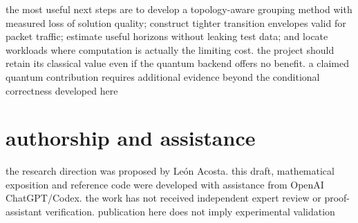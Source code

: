 \documentclass[11pt,a4paper]{article}
\newcommand{\1}{\mathbf{1}}
\begin{document}
the most useful next steps are to develop a topology-aware grouping method with measured loss of solution quality; construct tighter transition envelopes valid for packet traffic; estimate useful horizons without leaking test data; and locate workloads where computation is actually the limiting cost. the project should retain its classical value even if the quantum backend offers no benefit. a claimed quantum contribution requires additional evidence beyond the conditional correctness developed here

\section*{authorship and assistance}
the research direction was proposed by Le\'on Acosta. this draft, mathematical exposition and reference code were developed with assistance from OpenAI ChatGPT/Codex. the work has not received independent expert review or proof-assistant verification. publication here does not imply experimental validation
\end{document}
